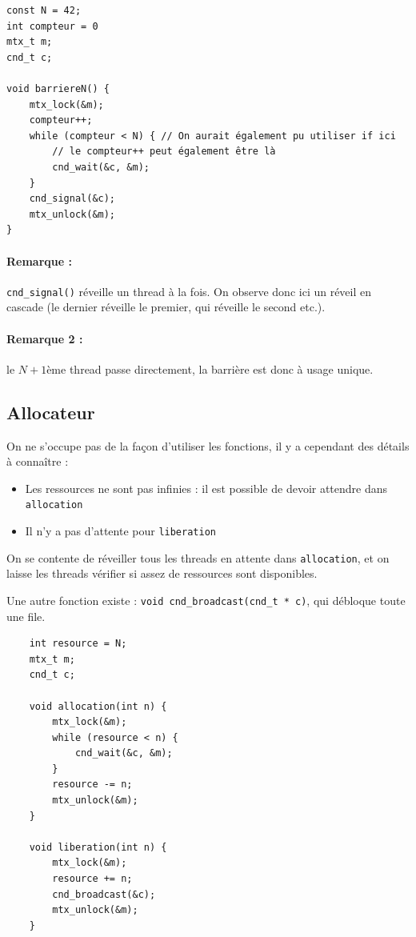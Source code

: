 \documentclass[11pt]{article}
\begin{document}
\begin{verbatim}
const N = 42;
int compteur = 0
mtx_t m;
cnd_t c;

void barriereN() {
    mtx_lock(&m);
    compteur++;
    while (compteur < N) { // On aurait également pu utiliser if ici
        // le compteur++ peut également être là
        cnd_wait(&c, &m);
    }
    cnd_signal(&c);
    mtx_unlock(&m);
}
\end{verbatim}

\paragraph{Remarque :} \texttt{cnd_signal()} réveille un thread à la fois. On observe donc ici un réveil en cascade (le dernier réveille le premier, qui réveille le second etc.).

\paragraph{Remarque 2 : } le $N+1$ème thread passe directement, la barrière est donc à usage unique.

\subsection{Allocateur}
On ne s'occupe pas de la façon d'utiliser les fonctions, il y a cependant des détails à connaître :
\begin{itemize}
    \item Les ressources ne sont pas infinies : il est possible de devoir attendre dans \texttt{allocation}
    \item Il n'y a pas d'attente pour \texttt{liberation}
\end{itemize}

On se contente de réveiller tous les threads en attente dans \texttt{allocation}, et on laisse les threads vérifier si assez de ressources sont disponibles.

Une autre fonction existe : \texttt{void cnd_broadcast(cnd_t * c)}, qui débloque toute une file.

\begin{verbatim}
    int resource = N;
    mtx_t m;
    cnd_t c;

    void allocation(int n) {
        mtx_lock(&m);
        while (resource < n) {
            cnd_wait(&c, &m);
        }
        resource -= n;
        mtx_unlock(&m);
    }

    void liberation(int n) {
        mtx_lock(&m);
        resource += n;
        cnd_broadcast(&c);
        mtx_unlock(&m);
    }
\end{verbatim}
\end{document}
